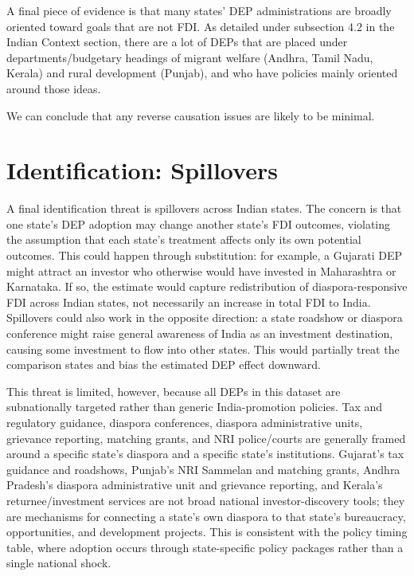 \documentclass[doublespace,nopageskip]{UVAthesis}
\begin{document}
A final piece of evidence is that many states' DEP administrations are broadly oriented toward goals that are not FDI. As detailed under subsection 4.2 in the Indian Context section, there are a lot of DEPs that are placed under departments/budgetary headings of migrant welfare (Andhra, Tamil Nadu, Kerala) and rural development (Punjab), and who have policies mainly oriented around those ideas. 

We can conclude that any reverse causation issues are likely to be minimal.


\section{Identification: Spillovers} \label{ss:spillovers}

A final identification threat is spillovers across Indian states. The concern is that one state's DEP adoption may change another state's FDI outcomes, violating the assumption that each state's treatment affects only its own potential outcomes. This could happen through substitution: for example, a Gujarati DEP might attract an investor who otherwise would have invested in Maharashtra or Karnataka. If so, the estimate would capture redistribution of diaspora-responsive FDI across Indian states, not necessarily an increase in total FDI to India. Spillovers could also work in the opposite direction: a state roadshow or diaspora conference might raise general awareness of India as an investment destination, causing some investment to flow into other states. This would partially treat the comparison states and bias the estimated DEP effect downward.

This threat is limited, however, because all DEPs in this dataset are subnationally targeted rather than generic India-promotion policies. Tax and regulatory guidance, diaspora conferences, diaspora administrative units, grievance reporting, matching grants, and NRI police/courts are generally framed around a specific state's diaspora and a specific state's institutions. Gujarat's tax guidance and roadshows, Punjab's NRI Sammelan and matching grants, Andhra Pradesh's diaspora administrative unit and grievance reporting, and Kerala's returnee/investment services are not broad national investor-discovery tools; they are mechanisms for connecting a state's own diaspora to that state's bureaucracy, opportunities, and development projects. This is consistent with the policy timing table, where adoption occurs through state-specific policy packages rather than a single national shock.
\end{document}
